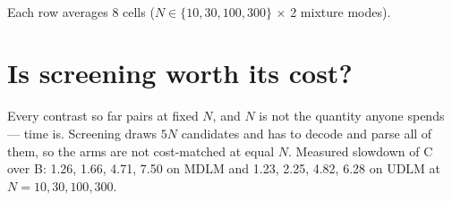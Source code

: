 \documentclass[11pt]{article}
\begin{document}
\begin{table}[htbp]
\centering
\footnotesize
\setlength{\tabcolsep}{4pt}
\\[0.4em] \begin{minipage}{0.92\textwidth}\footnotesize Each row averages 8 cells ($N \in \{10, 30, 100, 300\}$ $\times$ 2 mixture modes).\end{minipage}
\caption{Screening gain ($\mathrm{C} - \mathrm{B}$) against tilt strength, averaged over $N$ and mixture mode. The gain grows with $\lambda$ on both models, opposite to the direction predicted for \texttt{exclude\_invalid}.}
\label{tab:ov-gain-lambda}
\end{table}

\section{Is screening worth its cost?}

Every contrast so far pairs at fixed $N$, and $N$ is not the quantity anyone
spends --- time is. Screening draws $5N$ candidates and has to decode and parse
all of them, so the arms are not cost-matched at equal $N$. Measured slowdown of
C over B: 1.26, 1.66, 4.71, 7.50 on MDLM and 1.23, 2.25, 4.82, 6.28 on UDLM at
$N = 10, 30, 100, 300$.
\end{document}
